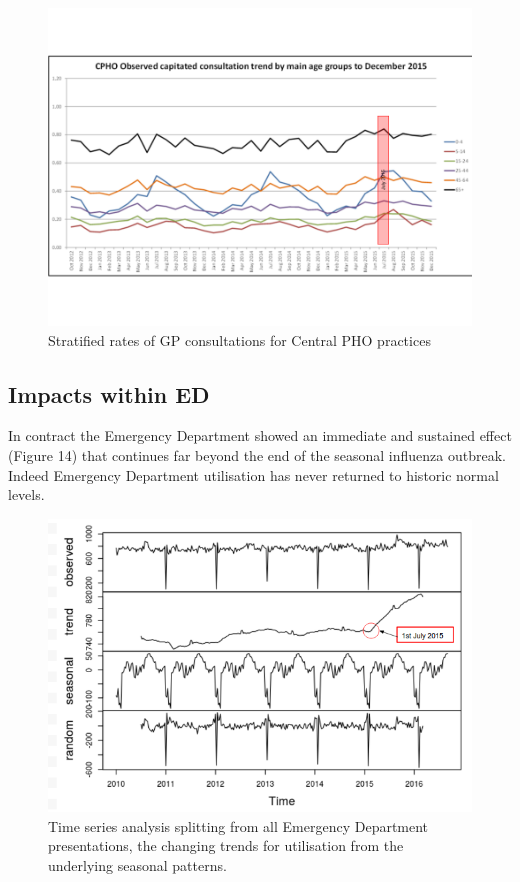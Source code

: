 \documentclass[11pt,a4paper]{article}
\begin{document}
\begin{figure}[htp]
\centering
\includegraphics[scale=0.30]{GPu13.png}
\caption{Stratified rates of GP consultations for Central PHO practices}
\label{Age stratified General Practice consultations}
\end{figure}

\subsection{Impacts within ED}
In contract the Emergency Department showed an immediate and sustained effect (Figure 14) that continues far beyond the end of the seasonal influenza outbreak. Indeed Emergency Department utilisation has never returned to historic normal levels.\\

\begin{figure}[htp]
\centering
\includegraphics[scale=0.60]{TS_ED.png}
\caption{Time series analysis splitting from all Emergency Department presentations, the changing trends for utilisation from the underlying seasonal patterns.}
\label{Time series analysis of Emergency Department presentations}
\end{figure}
\end{document}
